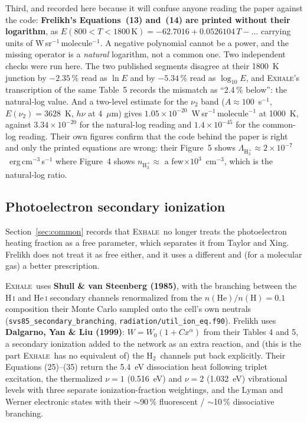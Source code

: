 \documentclass[english,a4paper]{my_memo}
\newcommand{\EXHALE}{\textsc{Exhale}}
\newcommand{\Hth}{\ensuremath{\mathrm{H}_3^+}}
\newcommand{\Htwo}{\ensuremath{\mathrm{H}_2}}
\begin{document}
Third, and recorded here because it will confuse anyone reading the paper
against the code: \textbf{Frelikh's Equations~(13) and~(14) are printed
without their logarithm}, as
$E(800 < T < 1800\,\mathrm{K}) = -62.7016 + 0.0526104\,T - \ldots$ carrying
units of W\,sr$^{-1}$\,molecule$^{-1}$. A negative polynomial cannot be a
power, and the missing operator is a \emph{natural} logarithm, not a common
one. Two independent checks were run here. The two published segments
disagree at their 1800~K junction by $-2.35\,\%$ read as $\ln E$ and by
$-5.34\,\%$ read as $\log_{10}E$, and \EXHALE's transcription of the same
Table~5 records the mismatch as ``2.4\,\% below'': the natural-log value.
And a two-level estimate for the $\nu_2$ band ($A \approx 100$~s$^{-1}$,
$E(\nu_2) = 3628$~K, $h\nu$ at 4~$\mu$m) gives
$1.05\times10^{-20}$~W\,sr$^{-1}$\,molecule$^{-1}$ at 1000~K, against
$3.34\times10^{-20}$ for the natural-log reading and $1.4\times10^{-45}$ for
the common-log reading. Their own figures confirm that the code behind the
paper is right and only the printed equations are wrong: their Figure~5 shows
$\Lambda_{\Hth}\approx2\times10^{-7}$~erg\,cm$^{-3}$\,s$^{-1}$ where Figure~4
shows $n_{\Hth}\approx$ a few$\times10^{3}$~cm$^{-3}$, which is the
natural-log ratio.

\subsection{Photoelectron secondary ionization}
\label{sec:secion}

Section~\ref{sec:common} records that \EXHALE\ no longer treats the
photoelectron heating fraction as a free parameter, which separates it from
Taylor and Xing. Frelikh does not treat it as free either, and it uses a
different and (for a molecular gas) a better prescription.

\EXHALE\ uses \textbf{Shull \& van Steenberg (1985)}, with the branching
between the H\,\textsc{i} and He\,\textsc{i} secondary channels renormalized
from the $n(\mathrm{He})/n(\mathrm{H}) = 0.1$ composition their Monte Carlo
sampled onto the cell's own neutrals (\texttt{svs85\_secondary\_branching},
\texttt{radiation/util\_ion\_eq.f90}). Frelikh uses \textbf{Dalgarno, Yan \&
Liu (1999)}: $W = W_0(1 + Cx^{\alpha})$ from their Tables 4 and 5, a secondary
ionization added to the network as an extra reaction, and (this is the
part \EXHALE\ has no equivalent of) the \Htwo\ channels put back
explicitly. Their Equations (25)--(35) return the 5.4~eV dissociation heat
following triplet excitation, the thermalized $\nu = 1$ (0.516~eV) and
$\nu = 2$ (1.032~eV) vibrational levels with three separate ionization-fraction
weightings, and the Lyman and Werner electronic states with their
$\sim$90\,\% fluorescent / $\sim$10\,\% dissociative branching.
\end{document}
